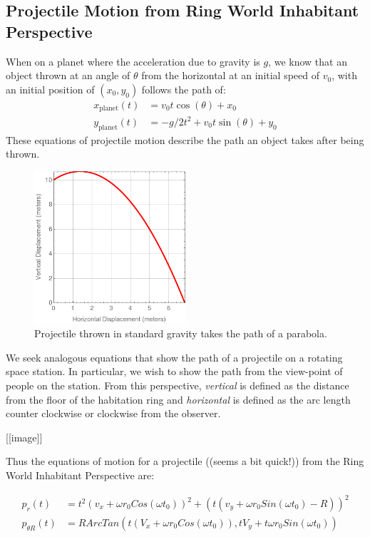 \documentclass{amsart}
\theoremstyle{definition}
\begin{document}
\subsection{Projectile Motion from Ring World Inhabitant Perspective}


When on a planet where the acceleration due to gravity is $g$, we know
that an object thrown at an angle of $\theta$ from the horizontal at
an initial speed of $v_0$, with an initial position of $(x_0,y_0)$
follows the path of:
\begin{align*}
  x_{\mathrm{planet}}(t) &=  v_0 t \cos(\theta)  + x_0\\
  y_{\mathrm{planet}}(t) &=  -g/2 t^2 + v_0 t \sin(\theta)  + y_0
\end{align*}
These equations of projectile motion describe the path an object takes
after being thrown.

\begin{figure}[h]
  \centering
  \includegraphics[width=0.5\textwidth]{Projectile_In_Gravity.png}
  \caption{Projectile thrown in standard gravity takes the path of a parabola.}
  \label{fig:Braun Wheel}
\end{figure}

We seek analogous equations that show the path of a projectile on a
rotating space station. In particular, we wish to show the path from
the view-point of people on the station.  From this perspective,
\textit{vertical} is defined as the distance from the floor of the
habitation ring and \textit{horizontal} is defined as the arc length
counter clockwise or clockwise from the observer.

[[image]]


Thus the equations of motion for a projectile ((seems a bit quick!))
from the Ring World Inhabitant Perspective are:

\begin{align*}
  p_{r}(t) &= t^2 (v_x + \omega r_0 Cos(\omega t_0))^2 + (t(v_y + \omega
  r_0 Sin(\omega t_0) - R))^2\\
  p_{\theta R}(t) &=R ArcTan(t(V_x + \omega r_0 Cos(\omega t_0)),tV_y +
                    t \omega r_0 Sin(\omega t_0))
\end{align*}
\end{document}
